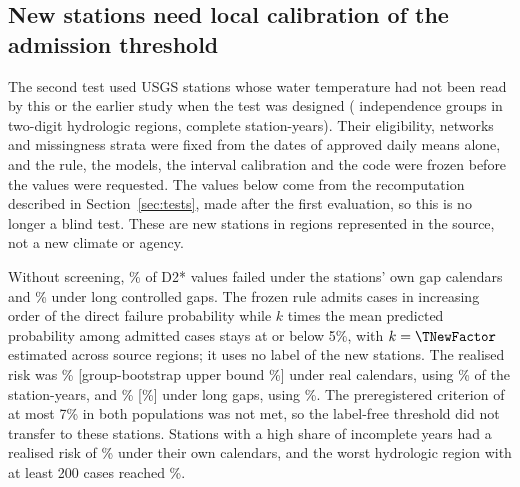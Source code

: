 \subsection{New stations need local calibration of the admission threshold}
The second test used \TNewStations{} USGS stations whose water temperature had not been read by this or the earlier study when the test was designed (\TNewGroups{} independence groups in \TNewHucs{} two-digit hydrologic regions, \TNewYears{} complete station-years). Their eligibility, networks and missingness strata were fixed from the dates of approved daily means alone, and the rule, the models, the interval calibration and the code were frozen before the values were requested. The values below come from the recomputation described in Section~\ref{sec:tests}, made after the first evaluation, so this is no longer a blind test. These are new stations in regions represented in the source, not a new climate or agency.

Without screening, \TNewUnscreenedDeploy\% of D2* values failed under the stations' own gap calendars and \TNewUnscreenedMech\% under long controlled gaps. The frozen rule admits cases in increasing order of the direct failure probability while $k$ times the mean predicted probability among admitted cases stays at or below 5\%, with $k=\TNewFactor$ estimated across source regions; it uses no label of the new stations. The realised risk was \TNewRiskDeploy\% [group-bootstrap upper bound \TNewRiskDeployHigh\%] under real calendars, using \TNewRetDeploy\% of the station-years, and \TNewRiskMech\% [\TNewRiskMechHigh\%] under long gaps, using \TNewRetMech\%. The preregistered criterion of at most 7\% in both populations was not met, so the label-free threshold did not transfer to these stations. Stations with a high share of incomplete years had a realised risk of \TNewRiskDeployHighMissing\% under their own calendars, and the worst hydrologic region with at least 200 cases reached \TNewWorstRegionRisk\%.

